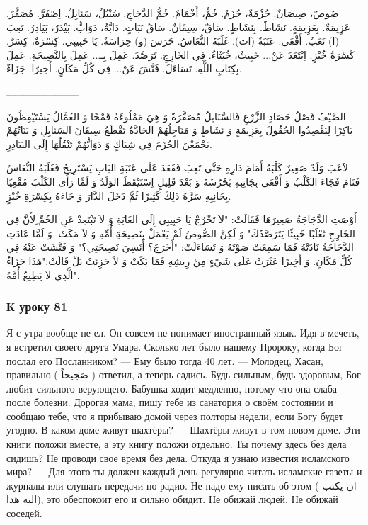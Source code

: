 \documentclass[a5paper]{article}
\newcommand\textstylePolicepardfaut[1]{#1}
\begin{document}
صُوصٌ، صِيصَانٌ. حُزْمَةٌ، حُزَمٌ. خُمٌّ، أَخْمَامٌ.\newline
خُمُّ الدَّجَاجِ. سُنْبُلٌ، سَنَابِلُ. اِصْفَرَّ. مُصَفَّرٌ. عَزِيمَةٌ. بِعَزِيمَةٍ. نَشَاطٌ. بِنَشَاطٍ. سَاقٌ، سِيقَانٌ. سَاقُ نَبَاتٍ. دَابَّةٌ، دَوَابُّ. بَيْدَرٌ، بَيَادِرُ. تَعِبَ (ا) تَعَبٌ. أَقْعَى. عَتَبَةٌ (ات). غَلَبَهُ النُّعَاسُ. حَرَسَ (و) حِرَاسَةٌ. يَا حَبِيبِي. كِسْرَةٌ، كِسَرٌ. كَسْرَةُ خُبْزٍ. اِبْتَعَدَ عَنْ... خَبِيثٌ، خُبَثَاءُ. فِي الخَارِجِ. تَرَصَّدَ. عَمِلَ بِـ... عَمِلَ بِالنَّصِيحَةِ. عَمِلَ بِكِتَابِ اللَّهِ. تَسَاءَلَ. فَتَّشَ عَنْ... فِي كُلِّ مَكَانٍ. أَخِيرًا. جَزَاءٌ.

ـــــــــــــــــــــــــ

الصَّيْفُ فَصْلُ حَصَادِ الزَّرْعِ فَالسَّنَابِلُ مُصَفَّرَةٌ وَ هِيَ مَمْلُوءَةٌ قَمْحًا وَ العُمَّالُ يَسْتَيْقِظُونَ بَاكِرًا لِيَقْصِدُوا الحُقُولَ بِعَزِيمَةٍ وَ نَشَاطٍ وَ مَنَاجِلُهُمْ الحَادَّةُ تَقْطَعُ سِيقَانَ السَنَابِلِ وَ بَنَاتُهُمْ يَجْمَعْنَ الحُزَمَ فِي شِبَاكٍ وَ دَوَابُّهُمْ تَنْقُلُهَا إِلَى البَيَادِرِ. 

لاَعَبَ وَلَدٌ صَغِيرٌ كَلْبَهُ أَمَامَ دَارِهِ حَتَّى تَعِبَ فَقَعَدَ عَلَى عَتَبَةِ البَابِ يَسْتَرِيحُ فَغَلَبَهُ النُّعَاسُ فَنَامَ فَجَاءَ الكَلْبُ وَ أَقْعَى بِجَانِبِهِ يَحْرُسُهُ وَ بَعْدَ قَلِيلٍ اِسْتَيْقَظَ الوَلَدُ وَ لَمَّا رَأَى الكَلْبَ مُقْعِيًا بِجَانِبِهِ سَرَّهُ ذَلِكَ كَثِيرًا ثُمَّ دَخَلَ الدَّارَ وَ جَاءَهُ بِكِسْرَةِ خُبْزٍ.

أَوْصَتِ الدَّجَاجَةُ صَغِيرَهَا فَقَالَتْ: "لاَ تَخْرُجْ يَا حَبِيبِي إِلَى الغَابَةِ وَ لاَ تَبْتَعِدْ عَنِ الخُمِّ ِلأَنَّ فِي الخَارِجِ ثَعْلَبًا خَبِيثًا يَتَرَصَّدُكَ" وَ لَكِنَّ الصُّوصُ لَمْ يَعْمَلْ بِنَصِيحَةِ أُمِّهِ وَ لاَ مَكَثَ. وَ لَمَّا عَادَتِ الدَّجَاجَةُ نَادَتْهُ فَمَا سَمِعَتْ صَوْتَهُ وَ تَسَاءَلَتْ: "أَخَرَجَ؟ أَنَسِيَ نَصِيحَتِي؟" وَ فَتَّشَتْ عَنْهُ فِي كُلِّ مَكَانٍ. وَ أَخِيرًا عَثَرَتْ عَلَى شَيْءٍ مِنْ رِيشِهِ فَمَا بَكَتْ وَ لاَ حَزِنَتْ بَلْ قَالَتْ:"هَذَا جَزَاءُ الَّذِي لاَ يَطِيعُ أُمَّهُ".

\subsubsection{К уроку 81}
Я с утра вообще не ел. Он совсем не понимает иностранный язык. Идя в мечеть, я встретил своего друга Умара. Сколько лет было нашему Пророку, когда Бог послал его Посланником? — Ему было тогда 40 лет. — Молодец, Хасан, правильно ( \textstylePolicepardfaut{صَحِيحاً} ) ответил, а теперь садись. Будь сильным, будь здоровым, Бог любит сильного верующего. Бабушка ходит медленно, потому что она слаба после болезни. Дорогая мама, пишу тебе из санатория о своём состоянии и сообщаю тебе, что я прибываю домой через полторы недели, если Богу будет угодно. В каком доме живут шахтёры? — Шахтёры живут в том новом доме. Эти книги положи вместе, а эту книгу положи отдельно. Ты почему здесь без дела сидишь? Не проводи свое время без дела. Откуда я узнаю известия исламского мира? — Для этого ты должен каждый день регулярно читать исламские газеты и журналы или слушать передачи по радио. Не надо ему писать об этом ( ان يكتب اليه هذا), это обеспокоит его и сильно обидит. Не обижай людей. Не обижай соседей.
\end{document}
